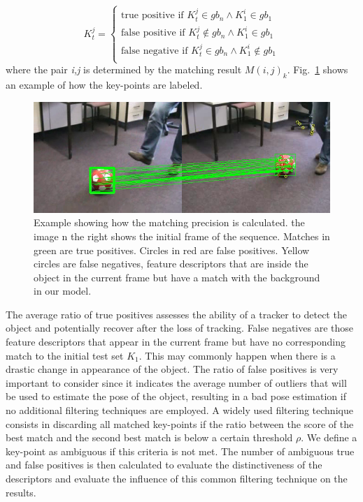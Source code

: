 \begin{equation}
K_{t}^{j} = 
\begin{cases}
\text{true positive}  \text{ if } K_{t}^{j} \in gb_{n} \land K_{1}^{i} \in gb_{1} \\
\text{false positive}  \text{ if } K_{t}^{j} \notin gb_{n} \land K_{1}^{i} \in gb_{1} \\
\text{false negative}  \text{ if } K_{t}^{j} \in gb_{n} \land K_{1}^{i} \notin gb_{1} \\
\end{cases}
\end{equation}
where the pair \textit{i,j} is determined by the matching result $M(i,j)_{k}$. Fig.~\ref{fig:matching} shows an example of how the key-points are labeled. 

\begin{figure}[!htb]
	\includegraphics[width=0.95\linewidth]{imgs/matching.png}
\vspace{-2.5mm}	
\caption{Example showing how the matching precision is calculated. the image n the right shows the initial frame of the sequence. Matches in green are true positives. Circles in red are false positives. Yellow circles are false negatives, feature descriptors that are inside the object in the current frame but have a match with the background in our model.}
\label{fig:matching}
\end{figure}

The average ratio of true positives assesses the ability of a tracker to detect the object and potentially recover after the loss of tracking. False negatives are those feature descriptors that appear in the current frame but have no corresponding match to the initial test set $K_{1}$. This may commonly happen when there is a drastic change in appearance of the object. The ratio of false positives is very important to consider since it indicates the average number of outliers that will be used to estimate the pose of the object, resulting in a bad pose estimation if no additional filtering techniques are employed. A widely used filtering technique consists in discarding all matched key-points if the ratio between the score of the best match and the second best match is below a certain threshold $\rho$. We define a key-point as ambiguous if this criteria is not met. The  number of ambiguous true and false positives is then calculated to evaluate the distinctiveness of the descriptors and evaluate the influence of this common filtering technique on the results.


